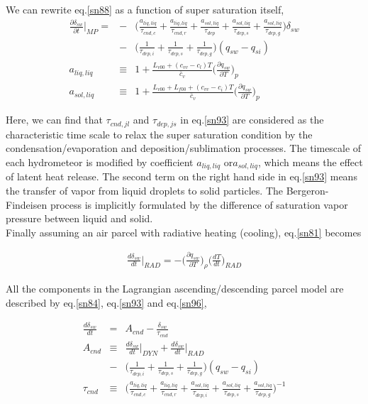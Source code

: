 We can rewrite eq.\ref{sn88} as a function of super saturation itself,
\begin{eqnarray}
\frac{\partial \delta_{sw}}{\partial t}\Bigr|_{MP}=&-&\bigl(\frac{a_{liq,liq}}{\tau_{cnd,c}}+\frac{a_{liq,liq}}{\tau_{cnd,r}}+\frac{a_{sol,liq}}{\tau_{dep}}+\frac{a_{sol,liq}}{\tau_{dep,s}}+\frac{a_{sol,liq}}{\tau_{dep,g}}\bigr)\delta_{sw}\nonumber\\
&-&\bigl(\frac{1}{\tau_{dep,i}}+\frac{1}{\tau_{dep,s}}+\frac{1}{\tau_{dep,g}}\bigr)(q_{sw}-q_{si})\label{sn93}\\
a_{liq,liq}&\equiv& 1+\frac{L_{v00}+(c_{vv}-c_{l})T}{\bar{c}_{v}}\bigl(\frac{\partial q_{sw}}{\partial T}\bigr)_{p}\label{94}\\
a_{sol,liq}&\equiv& 1+\frac{L_{v00}+L_{f00}+(c_{vv}-c_{i})T}{\bar{c}_{v}}\bigl(\frac{\partial q_{sw}}{\partial T}\bigr)_{p}\label{95}
\end{eqnarray}

Here, we can find that $\tau_{cnd,jl}$ and $\tau_{dep,js}$ in eq.\ref{sn93} are considered as the characteristic time scale to relax the super saturation condition by the condensation/evaporation and deposition/sublimation processes. The timescale of each hydrometeor is modified by coefficient $a_{liq,liq}$ or$ a_{sol,liq}$, which means the effect of latent heat release. The second term on the right hand side in eq.\ref{sn93} means the transfer of vapor from liquid droplets to solid particles. The Bergeron-Findeisen process is implicitly formulated by the difference of saturation vapor pressure between liquid and solid.\\
Finally assuming an air parcel with radiative heating (cooling), eq.\ref{sn81} becomes

\begin{eqnarray}
\frac{d\delta_{sw}}{dt}\Bigr|_{RAD}=-\bigl(\frac{\partial q_{sw}}{\partial T}\bigr)_{\rho}\bigl(\frac{dT}{dt}\bigr)_{RAD}\label{sn96}
\end{eqnarray}

All the components in the Lagrangian ascending/descending parcel model are described by eq.\ref{sn84}, eq.\ref{sn93} and eq.\ref{sn96},

\begin{eqnarray}
\frac{d\delta_{sw}}{dt}&=&A_{cnd}-\frac{\delta_{sw}}{\tau_{cnd}}\label{sn97}\\
A_{cnd}&\equiv&\frac{d\delta_{sw}}{dt}\Bigr|_{DYN}+\frac{d\delta_{sw}}{dt}\Bigr|_{RAD}\nonumber\\
&-&\bigl(\frac{1}{\tau_{dep,i}}+\frac{1}{\tau_{dep,s}}+\frac{1}{\tau_{dep,g}}\bigr)(q_{sw}-q_{si})\label{sn98}\\
\tau_{cnd}&\equiv&\bigl(\frac{a_{liq,liq}}{\tau_{cnd,c}}+\frac{a_{liq,liq}}{\tau_{cnd,r}}+\frac{a_{sol,liq}}{\tau_{dep,i}}+\frac{a_{sol,liq}}{\tau_{dep,s}}+\frac{a_{sol,liq}}{\tau_{dep,g}}\bigr)^{-1}\label{sn99}
\end{eqnarray}


